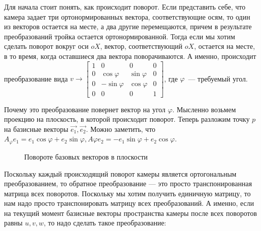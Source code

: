 \documentclass{article}
\begin{document}

Для начала стоит понять, как происходит поворот. Если представить себе, что камера задает три ортонормированных вектора, соответствующие осям, то один из векторов остается на месте, а два другие перемещаются, причем в результате преобразований тройка остается ортонормированной. Тогда если мы хотим сделать поворот вокруг оси $oX$, вектор, соответствующий $oX$, остается на месте, в то время, когда оставшиеся два вектора поворачиваются. А именно, происходит преобразование вида $v \to \begin{bmatrix} 1 & 0 & 0 & 0 \\ 0 & \cos \varphi & \sin \varphi & 0 \\ 0 & -\sin \varphi & \cos \varphi & 0 \\ 0 & 0 & 0 & 1\end{bmatrix}$, где $\varphi$~--- требуемый угол.

Почему это преобразование повернет вектор на угол $\varphi$. Мысленно возьмем проекцию на плоскость, в которой происходит поворот. Теперь разложим точку $p$ на базисные векторы $\vec{e_1}, \vec{e_2}$. Можно заметить, что $A_{\varphi} e_1 = e_1 \cos \varphi + e_2 \sin \varphi, A \varphi e_2 = -e_1 \sin \varphi + e_2 \cos \varphi$.

\begin{center}
\begin{figure}[H]
\caption{Повороте базовых векторов в плоскости}
\label{ris:image}
\end{figure}
\end{center}


Поскольку каждый происходящий поворот камеры является ортогональным преобразованием, то обратное преобразование --- это просто транспонированная матрица всех поворотов. Поскольку мы хотим получить единичную матрицу, то нам надо просто транспонировать матрицу всех преобразований. А именно, если на текущий момент базисные векторы пространства камеры после всех поворотов равны $u, v, w$, то надо сделать такое преобразование:
\end{document}
